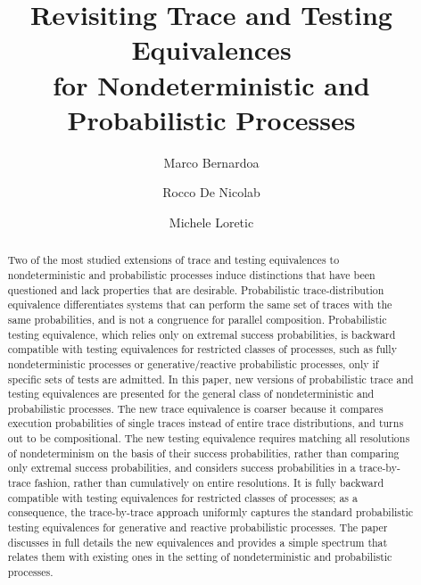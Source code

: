 \documentclass{LMCS}
\begin{document}
\title[Revisiting Trace and Testing Equivalences for Nondet.\ and Prob.\ Processes]
      {Revisiting Trace and Testing Equivalences \\
       for Nondeterministic and Probabilistic Processes}

\author[M.~Bernardo]{Marco Bernardo\rsuper a}
\address{{\lsuper a}Dipartimento di Scienze di Base e Fondamenti -- Universit\`a di Urbino -- Italy}

\author[R.~De~Nicola]{Rocco De Nicola\rsuper b}
\address{{\lsuper b}IMT -- Institute for Advanced Studies Lucca -- Italy}

\author[M.~Loreti]{Michele Loreti\rsuper c}
\address{{\lsuper c}Dipartimento di Statistica, Informatica, Applicazioni -- Universit\`a di Firenze -- Italy}





\begin{abstract}
  Two of the most studied extensions of trace and testing equivalences
  to nondeterministic and probabilistic processes induce distinctions
  that have been questioned and lack properties that are desirable.
  Probabilistic trace-distribution equivalence differentiates systems
  that can perform the same set of traces with the same probabilities,
  and is not a congruence for parallel composition. Probabilistic
  testing equivalence, which relies only on extremal success
  probabilities, is backward compatible with testing equivalences for
  restricted classes of processes, such as fully nondeterministic
  processes or generative/reactive probabilistic processes, only if
  specific sets of tests are admitted. In this paper, new versions of
  probabilistic trace and testing equivalences are presented for the
  general class of nondeterministic and probabilistic processes. The
  new trace equivalence is coarser because it compares execution
  probabilities of single traces instead of entire trace
  distributions, and turns out to be compositional. The new testing
  equivalence requires matching all resolutions of nondeterminism on
  the basis of their success probabilities, rather than comparing only
  extremal success probabilities, and considers success probabilities
  in a trace-by-trace fashion, rather than cumulatively on entire
  resolutions. It is fully backward compatible with testing
  equivalences for restricted classes of processes; as a consequence,
  the trace-by-trace approach uniformly captures the standard
  probabilistic testing equivalences for generative and reactive
  probabilistic processes. The paper discusses in full details the new
  equivalences and provides a simple spectrum that relates them with
  existing ones in the setting of nondeterministic and probabilistic
  processes.
\end{abstract}
\end{document}

